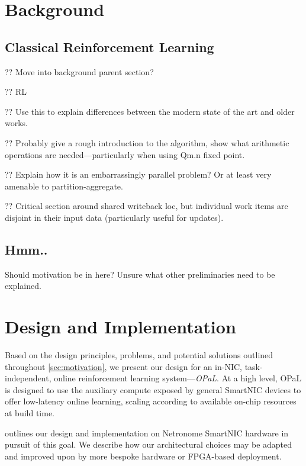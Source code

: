 \documentclass[sigconf,natbib=false]{acmart}
\newcommand{\approachshort}{OPaL}
\begin{document}
\section{Background}

\subsection{Classical Reinforcement Learning}
?? Move into background parent section?

?? RL~\parencite{RL2E}

?? Use this to explain differences between the modern state of the art and older works.

?? Probably give a rough introduction to the algorithm, show what arithmetic operations are needed---particularly when using Qm.n fixed point.

?? Explain how it is an embarrassingly parallel problem? Or at least very amenable to partition-aggregate.

?? Critical section around shared writeback loc, but individual work items are disjoint in their input data (particularly useful for updates).

\subsection{Hmm..}
Should motivation be in here? Unsure what other preliminaries need to be explained.

\section{Design and Implementation}\label{sec:design}
Based on the design principles, problems, and potential solutions outlined throughout \cref{sec:motivation}, we present our design for an in-NIC, task-independent, online reinforcement learning system---\emph{\approachshort{}}.
At a high level, \approachshort{} is designed to use the auxiliary compute exposed by general SmartNIC devices to offer low-latency online learning, scaling according to available on-chip resources at build time.

 outlines our design and implementation on Netronome SmartNIC hardware in pursuit of this goal.
We describe how our architectural choices may be adapted and improved upon by more bespoke hardware or FPGA-based deployment.
\end{document}

